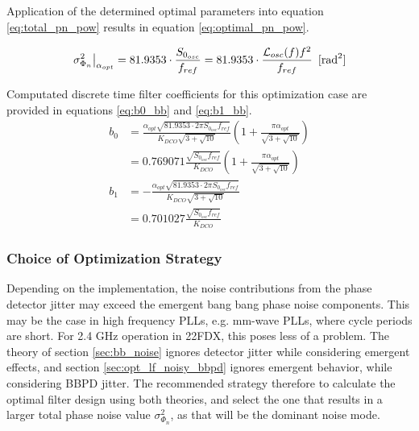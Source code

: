 Application of the determined optimal parameters into equation \ref{eq:total_pn_pow} results in equation \ref{eq:optimal_pn_pow}. 

	\begin{equation}\label{eq:optimal_pn_pow}
		\left.\sigma_{\Phi_{n}}^2\right|_{\alpha_{opt}} = 81.9353\cdot\frac{S_{0_{osc}}}{f_{ref}} = 81.9353\cdot \frac{\mathcal{L}_{osc}(f)f^2}{f_{ref}} \hspace{0.5em} [\textnormal{rad}^2]
	\end{equation}





	Computated discrete time filter coefficients for this optimization case are provided in equations \ref{eq:b0_bb} and \ref{eq:b1_bb}.
	\begin{align}
		b_0 &= \frac{\alpha_{opt}\sqrt{81.9353\cdot2\pi S_{0_{osc}} f_{ref}}}{K_{DCO}\sqrt{3+\sqrt{10}}}\left(1+\frac{\pi\alpha_{opt}}{\sqrt{3+\sqrt{10}}}\right)\label{eq:b0_bb}\\
		&= 0.769071 \frac{\sqrt{S_{0_{osc}} f_{ref}}}{K_{DCO}}\left(1+\frac{\pi\alpha_{opt}}{\sqrt{3+\sqrt{10}}}\right) \\
		b_1 &= -\frac{\alpha_{opt}\sqrt{81.9353\cdot2\pi S_{0_{osc}} f_{ref}}}{K_{DCO}\sqrt{3+\sqrt{10}}} \label{eq:b1_bb}\\
		&=0.701027 \frac{\sqrt{S_{0_{osc}} f_{ref}}}{K_{DCO}}
	\end{align}

	\subsubsection{Choice of Optimization Strategy}
	Depending on the implementation, the noise contributions from the phase detector jitter may exceed the emergent bang bang phase noise components. This may be the case in high frequency PLLs, e.g. mm-wave PLLs, where cycle periods are short. For 2.4 GHz operation in 22FDX, this poses less of a problem. The theory of section \ref{sec:bb_noise} ignores detector jitter while considering emergent effects, and section \ref{sec:opt_lf_noisy_bbpd} ignores emergent behavior, while considering BBPD jitter. The recommended strategy therefore to calculate the optimal filter design using both theories, and select the one that results in a larger total phase noise value $\sigma_{\Phi_{n}}^2$, as that will be the dominant noise mode. 

